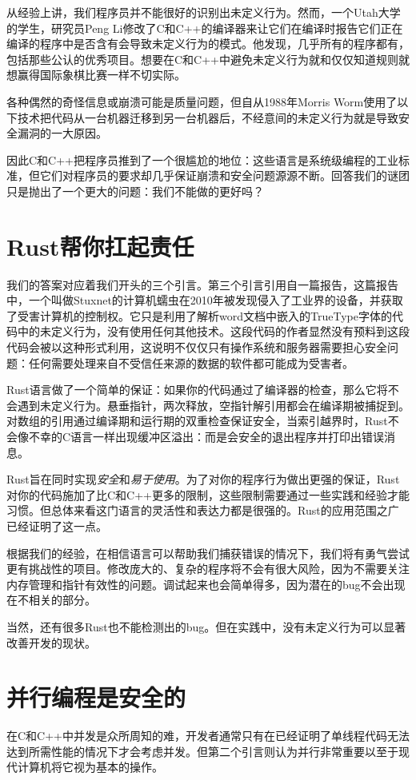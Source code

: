 从经验上讲，我们程序员并不能很好的识别出未定义行为。然而，一个Utah大学的学生，研究员Peng Li修改了C和C++的编译器来让它们在编译时报告它们正在编译的程序中是否含有会导致未定义行为的模式。他发现，几乎所有的程序都有，包括那些公认的优秀项目。想要在C和C++中避免未定义行为就和仅仅知道规则就想赢得国际象棋比赛一样不切实际。

各种偶然的奇怪信息或崩溃可能是质量问题，但自从1988年Morris Worm使用了以下技术把代码从一台机器迁移到另一台机器后，不经意间的未定义行为就是导致安全漏洞的一大原因。

因此C和C++把程序员推到了一个很尴尬的地位：这些语言是系统级编程的工业标准，但它们对程序员的要求却几乎保证崩溃和安全问题源源不断。回答我们的谜团只是抛出了一个更大的问题：我们不能做的更好吗？

\section{Rust帮你扛起责任}
我们的答案对应着我们开头的三个引言。第三个引言引用自一篇报告，这篇报告中，一个叫做Stuxnet的计算机蠕虫在2010年被发现侵入了工业界的设备，并获取了受害计算机的控制权。它只是利用了解析word文档中嵌入的TrueType字体的代码中的未定义行为，没有使用任何其他技术。这段代码的作者显然没有预料到这段代码会被以这种形式利用，这说明不仅仅只有操作系统和服务器需要担心安全问题：任何需要处理来自不受信任来源的数据的软件都可能成为受害者。

Rust语言做了一个简单的保证：如果你的代码通过了编译器的检查，那么它将不会遇到未定义行为。悬垂指针，两次释放，空指针解引用都会在编译期被捕捉到。对数组的引用通过编译期和运行期的双重检查保证安全，当索引越界时，Rust不会像不幸的C语言一样出现缓冲区溢出：而是会安全的退出程序并打印出错误消息。

Rust旨在同时实现\emph{安全}和\emph{易于使用}。为了对你的程序行为做出更强的保证，Rust对你的代码施加了比C和C++更多的限制，这些限制需要通过一些实践和经验才能习惯。但总体来看这门语言的灵活性和表达力都是很强的。Rust的应用范围之广已经证明了这一点。

根据我们的经验，在相信语言可以帮助我们捕获错误的情况下，我们将有勇气尝试更有挑战性的项目。修改庞大的、复杂的程序将不会有很大风险，因为不需要关注内存管理和指针有效性的问题。调试起来也会简单得多，因为潜在的bug不会出现在不相关的部分。

当然，还有很多Rust也不能检测出的bug。但在实践中，没有未定义行为可以显著改善开发的现状。

\section{并行编程是安全的}
在C和C++中并发是众所周知的难，开发者通常只有在已经证明了单线程代码无法达到所需性能的情况下才会考虑并发。但第二个引言则认为并行非常重要以至于现代计算机将它视为基本的操作。

